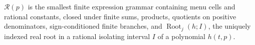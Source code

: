 \(\mathcal R(p)\) is the smallest finite expression grammar containing menu cells and rational constants, closed under finite sums, products, quotients on positive denominators, sign-conditioned finite branches, and \(\operatorname{Root}_j(h;I)\), the uniquely indexed real root in a rational isolating interval \(I\) of a polynomial \(h(t,p)\).
